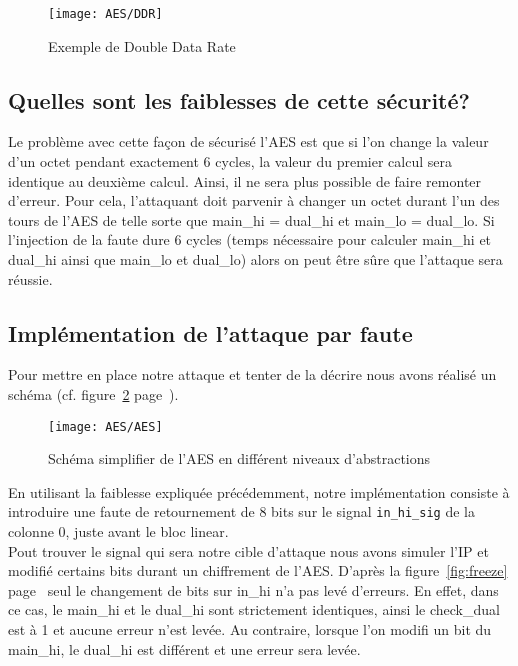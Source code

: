 \begin{figure}[!htbp]
	\begin{center}
		\texttt{[image: AES/DDR]}
		\caption{Exemple de Double Data Rate}
		\label{fig:DDR}
	\end{center}
\end{figure}

\subsection{Quelles sont les faiblesses de cette sécurité?}

Le problème avec cette façon de sécurisé l'AES est que si l'on change la valeur
d'un octet pendant exactement 6 cycles, la valeur du premier calcul sera
identique au deuxième calcul.
Ainsi, il ne sera plus possible de faire remonter d'erreur. 
Pour cela, l'attaquant doit parvenir à changer un octet durant l'un des tours de 
l'AES de telle sorte que main\_hi = dual\_hi et main\_lo = dual\_lo.
Si l'injection de la faute dure 6 cycles (temps nécessaire pour calculer
main\_hi et dual\_hi ainsi que main\_lo et dual\_lo) alors on peut être sûre que 
l'attaque sera réussie.

\subsection{Implémentation de l'attaque par faute}

Pour mettre en place notre attaque et tenter de la décrire nous avons réalisé 
un schéma (cf. figure~\ref{fig:AES} page~\pageref{fig:AES}).

\begin{figure}[!h]
	\begin{center}
		\texttt{[image: AES/AES]}
		\caption{Schéma simplifier de l'AES en différent niveaux d'abstractions}
		\label{fig:AES}
	\end{center}
\end{figure}

En utilisant la faiblesse expliquée précédemment, notre implémentation
consiste à introduire une faute de retournement de 8 bits sur le signal
\texttt{in\_hi\_sig} de la colonne 0, juste avant le bloc linear.\\
Pout trouver le signal qui sera notre cible d'attaque nous avons 
simuler l'IP et modifié certains bits durant un chiffrement de l'AES. 
D'après la figure~\ref{fig:freeze} page~\pageref{fig:freeze} seul le changement 
de bits sur in\_hi n'a pas levé d'erreurs. En effet, dans ce cas, le main\_hi et le  dual\_hi 
sont strictement identiques, ainsi le check\_dual est à 1 et aucune erreur n'est levée. 
Au contraire, lorsque l'on modifi un bit du main\_hi, le dual\_hi est différent 
et une erreur sera levée.\\

